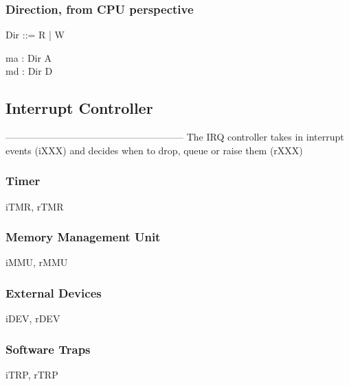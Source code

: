 \subsubsection{Direction, from CPU perspective}

\begin{circus}
Dir ::= R  %
        | W  %
\end{circus}

\begin{circus}
\circchannel ma : Dir \cross A\\  %
\circchannel md : Dir \cross D  %
\end{circus}


\subsection{Interrupt Controller} --------------------------------------------------------
The IRQ controller takes in interrupt events (iXXX)
and decides when to drop, queue or raise them (rXXX)


\subsubsection{Timer}

\begin{circus}
\circchannel iTMR, rTMR
\end{circus}

\subsubsection{Memory Management Unit}

\begin{circus}
\circchannel iMMU, rMMU
\end{circus}

\subsubsection{External Devices}

\begin{circus}
\circchannel iDEV, rDEV
\end{circus}

\subsubsection{Software Traps}
\begin{circus}
\circchannel iTRP, rTRP
\end{circus}

